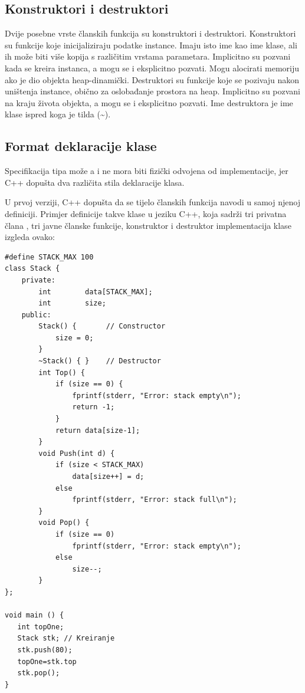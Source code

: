 \documentclass[11pt]{book}
\begin{document}
\subsection{Konstruktori i destruktori}

Dvije posebne vrste članskih funkcija su konstruktori i destruktori. Konstruktori su funkcije koje inicijaliziraju podatke instance. Imaju isto ime kao ime klase, ali ih može biti više kopija s različitim vrstama parametara. Implicitno su pozvani kada se kreira instanca, a mogu se i eksplicitno pozvati. Mogu alocirati memoriju ako je dio objekta heap-dinamički. Destruktori su funkcije koje se pozivaju nakon uništenja instance, obično za oslobađanje prostora na heap. Implicitno su pozvani na kraju života objekta, a mogu se i eksplicitno pozvati. Ime destruktora je ime klase ispred koga je tilda (\textasciitilde).

\subsection{Format deklaracije klase}
Specifikacija tipa može a i ne mora biti fizički odvojena od implementacije, jer C++ dopušta dva različita stila deklaracije klasa.

U prvoj verziji, C++ dopušta da se tijelo članskih funkcija navodi u samoj njenoj definiciji. Primjer definicije takve klase u jeziku C++, koja sadrži tri privatna člana , tri javne članske funkcije, konstruktor i destruktor implementacija klase izgleda ovako:

\begin{lstlisting}
#define STACK_MAX 100
class Stack {
    private:
        int        data[STACK_MAX];
        int        size;
    public:
        Stack() {       // Constructor
            size = 0;
        }
        ~Stack() { }    // Destructor
        int Top() {
            if (size == 0) {
                fprintf(stderr, "Error: stack empty\n");
                return -1;
            }
            return data[size-1];
        }
        void Push(int d) {
            if (size < STACK_MAX)
                data[size++] = d;
            else
                fprintf(stderr, "Error: stack full\n");
        }
        void Pop() {
            if (size == 0)
                fprintf(stderr, "Error: stack empty\n");
            else
                size--;
        }
};

void main () {
   int topOne;
   Stack stk; // Kreiranje
   stk.push(80);
   topOne=stk.top
   stk.pop();
}
\end{lstlisting}
\end{document}
